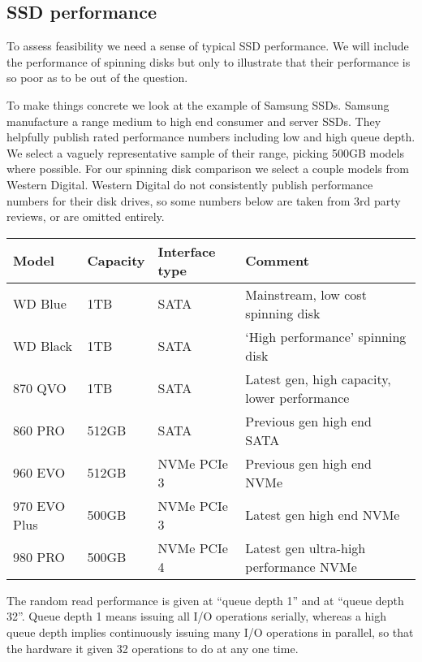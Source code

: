 \documentclass[11pt,a4paper]{article}
\begin{document}
\subsection{SSD performance}
\label{ssd-performance}

To assess feasibility we need a sense of typical SSD performance. We will
include the performance of spinning disks but only to illustrate that their
performance is so poor as to be out of the question.

To make things concrete we look at the example of Samsung SSDs. Samsung
manufacture a range medium to high end consumer and server SSDs. They helpfully
publish rated performance numbers including low and high queue depth. We select
a vaguely representative sample of their range, picking 500GB models where
possible. For our spinning disk comparison we select a couple models from
Western Digital. Western Digital do not consistently publish performance numbers
for their disk drives, so some numbers below are taken from 3rd party reviews,
or are omitted entirely.
\begin{center}
\begin{tabular}[]{llll}
  Model & Capacity & Interface type & Comment \\
  \toprule
  WD Blue      & 1TB   & SATA        & Mainstream, low cost spinning disk \\
  WD Black     & 1TB   & SATA        & `High performance' spinning disk  \\
  870 QVO      & 1TB   & SATA        & Latest gen, high capacity, lower performance \\
  860 PRO      & 512GB & SATA        & Previous gen high end SATA \\
  960 EVO      & 512GB & NVMe PCIe 3 & Previous gen high end NVMe \\
  970 EVO Plus & 500GB & NVMe PCIe 3 & Latest gen high end NVMe \\
  980 PRO      & 500GB & NVMe PCIe 4 & Latest gen ultra-high performance NVMe
\end{tabular}
\end{center}
The random read performance is given at ``queue depth 1'' and at ``queue depth
32''. Queue depth 1 means issuing all I/O operations serially, whereas a high
queue depth implies continuously issuing many I/O operations in parallel, so
that the hardware it given 32 operations to do at any one time.
\end{document}
